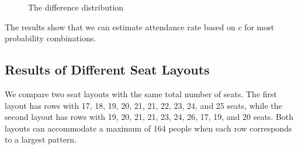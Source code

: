 \begin{figure}[ht]
  \centering
  \caption{The difference distribution}
  \label{Fig}
\end{figure}

The results show that we can estimate attendance rate based on $c$ for most probability combinations. 


\subsection{Results of Different Seat Layouts}
We compare two seat layouts with the same total number of seats. The first layout has rows with 17, 18, 19, 20, 21, 21, 22, 23, 24, and 25 seats, while the second layout has rows with 19, 20, 21, 21, 23, 24, 26, 17, 19, and 20 seats. Both layouts can accommodate a maximum of 164 people when each row corresponds to a largest pattern.

